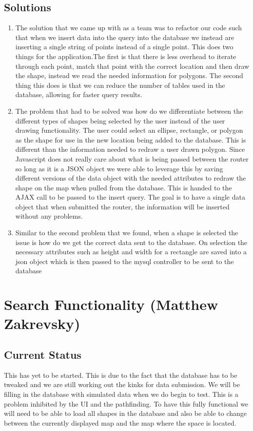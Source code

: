 \documentclass[letterpaper,10pt,titlepage, onecolumn, compsoc]{IEEEtran}
\begin{document}
\subsection{Solutions}
\begin{enumerate}
	\item The solution that we came up with as a team was to refactor our code such that when we insert data into the query into the database we instead are inserting a single string of points instead of a single point. This does two things for the application.The first is that there is less overhead to iterate through each point, match that point with the correct location and then draw the shape, instead we read the needed information for polygons. The second thing this does is that we can reduce the number of tables used in the database, allowing for faster query results.
    \item The problem that had to be solved was how do we differentiate between the different types of shapes being selected by the user instead of the user drawing functionality. The user could select an ellipse, rectangle, or polygon as the shape for use in  the new location being added to the database. This is different than the information needed to redraw a user drawn polygon. Since Javascript does not really care about what is being passed between the router so long as it is a JSON object we were able to leverage this by saving different versions of the data object with the needed attributes to redraw the shape on the map when pulled from the database. This is handed to the AJAX call to be passed to the insert query. The goal is to have a single data object that when submitted the router, the information will be inserted without any problems.
    \item Similar to the second problem that we found, when a shape is selected the issue is how do we get the correct data sent to the database. On selection the necessary attributes such as height and width for a rectangle are saved into a json object which is then passed to the mysql controller to be sent to the database
\end{enumerate}

\section{Search Functionality (Matthew Zakrevsky)}
\subsection{Current Status}
This has yet to be started. This is due to the fact that the database has to be tweaked and we are still working out the kinks for data submission. We will be filling in the database with simulated data when we do begin to test. This is a problem inhibited by the UI and the pathfinding. To have this fully functional we will need to be able to load all shapes in the database and also be able to change between the currently displayed map and the map where the space is located. 
\end{document}
